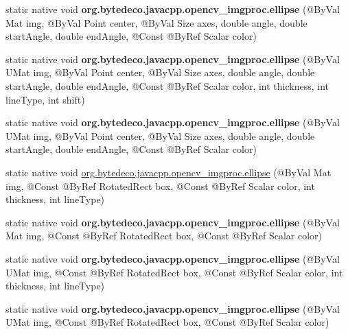 \begin{DoxyCompactItemize}
\mbox{\label{group__imgproc__draw_gaf55397a8f53b47bedcf99d53034662e1}} 
static native void {\bfseries org.\+bytedeco.\+javacpp.\+opencv\+\_\+imgproc.\+ellipse} (@By\+Val Mat img, @By\+Val Point center, @By\+Val Size axes, double angle, double start\+Angle, double end\+Angle, @Const @By\+Ref Scalar color)
\item 
\mbox{\label{group__imgproc__draw_gaba0d700bcd539788f3d33f872ddc3fbf}} 
static native void {\bfseries org.\+bytedeco.\+javacpp.\+opencv\+\_\+imgproc.\+ellipse} (@By\+Val U\+Mat img, @By\+Val Point center, @By\+Val Size axes, double angle, double start\+Angle, double end\+Angle, @Const @By\+Ref Scalar color, int thickness, int line\+Type, int shift)
\item 
\mbox{\label{group__imgproc__draw_ga9a7de14f5273857bcb1023332bfe3178}} 
static native void {\bfseries org.\+bytedeco.\+javacpp.\+opencv\+\_\+imgproc.\+ellipse} (@By\+Val U\+Mat img, @By\+Val Point center, @By\+Val Size axes, double angle, double start\+Angle, double end\+Angle, @Const @By\+Ref Scalar color)
\item 
static native void \hyperlink{group__imgproc__draw_gad8f98cdfda176a2e4e1560740c6b5adb}{org.\+bytedeco.\+javacpp.\+opencv\+\_\+imgproc.\+ellipse} (@By\+Val Mat img, @Const @By\+Ref Rotated\+Rect box, @Const @By\+Ref Scalar color, int thickness, int line\+Type)
\item 
\mbox{\label{group__imgproc__draw_ga9eba26e909a6b1bff5d442d5fc3a09cf}} 
static native void {\bfseries org.\+bytedeco.\+javacpp.\+opencv\+\_\+imgproc.\+ellipse} (@By\+Val Mat img, @Const @By\+Ref Rotated\+Rect box, @Const @By\+Ref Scalar color)
\item 
\mbox{\label{group__imgproc__draw_ga582f1cb3f0923be36ecf0156ff9b25d1}} 
static native void {\bfseries org.\+bytedeco.\+javacpp.\+opencv\+\_\+imgproc.\+ellipse} (@By\+Val U\+Mat img, @Const @By\+Ref Rotated\+Rect box, @Const @By\+Ref Scalar color, int thickness, int line\+Type)
\item 
\mbox{\label{group__imgproc__draw_ga387fe3dea4735080b3db76bb9180d002}} 
static native void {\bfseries org.\+bytedeco.\+javacpp.\+opencv\+\_\+imgproc.\+ellipse} (@By\+Val U\+Mat img, @Const @By\+Ref Rotated\+Rect box, @Const @By\+Ref Scalar color)

\end{DoxyCompactItemize}
